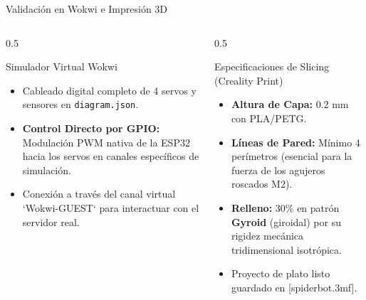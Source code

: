 \documentclass[10pt, aspectratio=169]{beamer}
\newcommand{\codigo}[1]{\texttt{#1}}
\begin{document}
\begin{frame}{Validación en Wokwi e Impresión 3D}
    \begin{columns}
        \begin{column}{0.5\textwidth}
            \begin{block}{Simulador Virtual Wokwi}
                \begin{itemize}
                    \item Cableado digital completo de 4 servos y sensores en \codigo{diagram.json}.
                    \item \textbf{Control Directo por GPIO:} Modulación PWM nativa de la ESP32 hacia los servos en canales específicos de simulación.
                    \item Conexión a través del canal virtual `Wokwi-GUEST` para interactuar con el servidor real.
                \end{itemize}
            \end{block}
        \end{column}
        \begin{column}{0.5\textwidth}
            \begin{alertblock}{Especificaciones de Slicing (Creality Print)}
                \begin{itemize}
                    \item \textbf{Altura de Capa:} $0.2\text{ mm}$ con PLA/PETG.
                    \item \textbf{Líneas de Pared:} Mínimo 4 perímetros (esencial para la fuerza de los agujeros roscados M2).
                    \item \textbf{Relleno:} $30\%$ en patrón \textbf{Gyroid} (giroidal) por su rigidez mecánica tridimensional isotrópica.
                    \item Proyecto de plato listo guardado en [spiderbot.3mf].
                \end{itemize}
            \end{alertblock}
        \end{column}
    \end{columns}
\end{frame}
\end{document}
